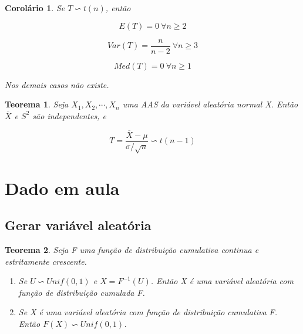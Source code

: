 \documentclass[12pt]{article}
\newtheorem{theorem}{Teorema}[section]
\newtheorem{corollary}{Corolário}[theorem]
\begin{document}
\begin{corollary}
    Se $T \backsim t(n)$, então 
    
    $$E(T) = 0 \ \forall n \geq 2$$
    
    $$Var(T) = \frac{n}{n-2} \ \forall n \geq 3$$
    
    $$Med(T) = 0 \ \forall n \geq 1$$
    
    Nos demais casos não existe.
\end{corollary}

\begin{theorem}
    Seja $X_1, X_2, \cdots, X_n$ uma AAS da variável aleatória normal X. Então $\overline{X}$ e $S^2$ são independentes, e
    
    $$T = \frac{\overline{X} - \mu}{\sigma / \sqrt{n}} \backsim t(n - 1)$$
\end{theorem}

\section{Dado em aula}
\subsection*{Gerar variável aleatória}
\begin{theorem}
    Seja F uma função de distribuição cumulativa continua e estritamente crescente.
    \begin{enumerate}
        \item Se $U \backsim Unif(0, 1)$ e $X = F^{-1} (U)$. Então X é uma variável aleatória com função de distribuição cumulada F.
        
        \item Se X é uma variável aleatória com função de distribuição cumulativa F. Então $F(X) \backsim Unif(0, 1)$.
    \end{enumerate}
\end{theorem}
\end{document}
